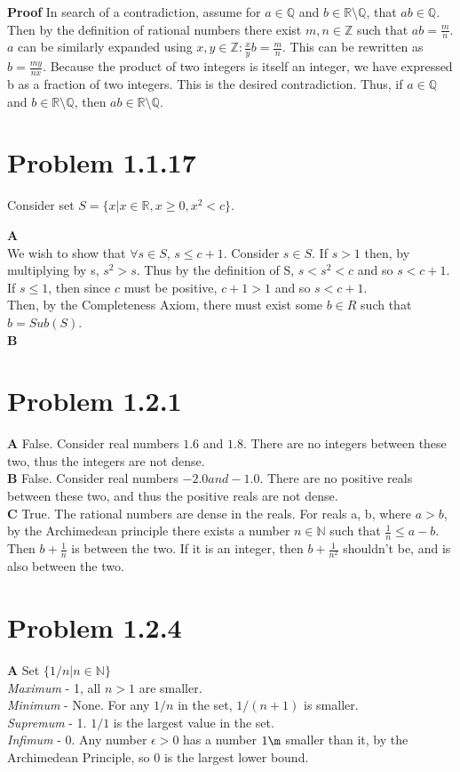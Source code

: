 \documentclass[10pt]{article} %
\begin{document}
\textbf{Proof} In search of a contradiction, assume for $a \in \mathbb{Q}$ and $b \in \mathbb{R}\setminus \mathbb{Q}$, that $ab \in \mathbb{Q}$. Then by the definition of rational numbers there exist $m,n \in \mathbb{Z}$ such that $ab = \frac{m}{n}$. $a$ can be similarly expanded using $x,y \in \mathbb{Z}: \frac{x}{y}b = \frac{m}{n}$. This can be rewritten as $b = \frac{my}{nx}$. Because the product of two integers is itself an integer, we have expressed b as a fraction of two integers. This is the desired contradiction. Thus, if $a \in \mathbb{Q}$ and $b \in \mathbb{R}\setminus \mathbb{Q}$, then $ab \in \mathbb{R}\setminus \mathbb{Q}$.

\section{Problem 1.1.17}
Consider set $S = \{x | x \in \mathbb{R}, x \geq 0, x^2 < c\}$.

\textbf{A}\\
We wish to show that $\forall s \in S$, $s \leq c + 1$. Consider $s \in S$. If $s > 1$ then, by multiplying by s, $s^2 > s$. Thus by the definition of S, $s < s^2 < c$ and so $s < c+1$. If $s \leq 1$, then since $c$ must be positive, $c + 1 > 1$ and so $s < c + 1$.\\

Then, by the Completeness Axiom, there must exist some $b \in R$ such that $b = Sub(S)$.\\

\textbf{B}\\

\section{Problem 1.2.1}
\textbf{A} False. Consider real numbers $1.6$ and $1.8$. There are no integers between these two, thus the integers are not dense.\\
\textbf{B} False. Consider real numbers $-2.0 and -1.0$. There are no positive reals between these two, and thus the positive reals are not dense.\\
\textbf{C} True. The rational numbers are dense in the reals. For reals a, b, where $a > b$, by the Archimedean principle there exists a number $n \in \mathbb{N}$ such that $\frac{1}{n} \leq a-b$. Then $b + \frac{1}{n}$ is between the two. If it is an integer, then $b + \frac{1}{n^2}$ shouldn't be, and is also between the two.


\section{Problem 1.2.4}
\textbf{A} Set $\{1/n | n \in \mathbb{N}\}$\\
\textit{Maximum} - 1, all $n > 1$ are smaller.\\
\textit{Minimum} - None. For any $1/n$ in the set, $1/(n+1)$ is smaller.\\
\textit{Supremum} - 1. $1/1$ is the largest value in the set.\\
\textit{Infimum} - 0. Any number $\epsilon > 0$ has a number $1\m$ smaller than it, by the Archimedean Principle, so 0 is the largest lower bound.\\
\end{document}
